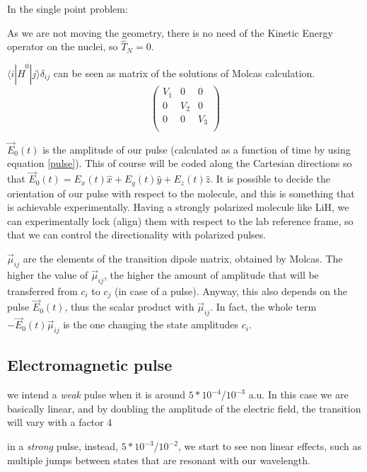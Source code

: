 In the single point problem:
\bee
\item As we are not moving the geometry, there is no need of the Kinetic Energy operator on the nuclei, so $\hat{T}_N=0$.
\item $\langle i|\hat{H}^0|j\rangle \delta_{ij}$ can be seen as matrix of the solutions of Molcas calculation.\\
\begin{equation}
\begin{pmatrix*}
  V_1 & 0 & 0 \\
  0 & V_2 & 0 \\
  0 & 0 & V_3 \\
\end{pmatrix*}
\end{equation}
\item $\vec{E}_0(t)$ is the amplitude of our pulse (calculated as a function of time by using equation \ref{pulse}). This of course will be coded along the Cartesian directions so that $\vec{E}_0(t)=E_x(t)\hat{x}+E_y(t)\hat{y}+E_z(t)\hat{z}$. It is possible to decide the orientation of our pulse with respect to the molecule, and this is something that is achievable experimentally. Having a strongly polarized molecule like LiH, we can experimentally lock (align) them with respect to the lab reference frame, so that we can control the directionality with polarized pulses.
\item $\vec{\mu}_{ij}$ are the elements of the transition dipole matrix, obtained by Molcas. The higher the value of $\vec{\mu}_{ij}$, the higher the amount of amplitude that will be transferred from $c_i$ to $c_j$ (in case of a pulse). Anyway, this also depends on the pulse $\vec{E}_0(t)$, thus the scalar product with $\vec{\mu}_{ij}$. In fact, the whole term $- \vec{E}_0(t) \vec{\mu}_{ij}$ is the one changing the state amplitudes $c_i$.
\ee

\subsection{Electromagnetic pulse}

\bee
\item we intend a \textit{weak} pulse when it is around $5*10^{-4}$/$10^{-3}$ a.u. In this case we are basically linear, and by doubling the amplitude of the electric field, the transition will vary with a factor 4
\item in a \textit{strong} pulse, instead, $5*10^{-3}$/$10^{-2}$, we start to see non linear effects, such as multiple jumps between states that are resonant with our wavelength.
\ee

